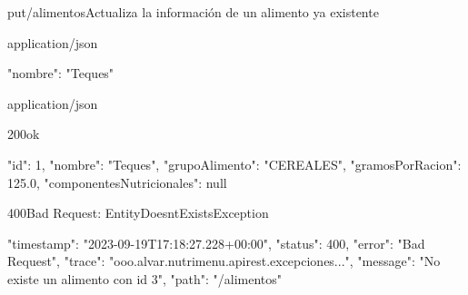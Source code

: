 \begin{apiRoute}{put}{/alimentos}{Actualiza la información de un alimento ya existente}
	\begin{routeParameter}
	\end{routeParameter}
	
	\begin{routeRequest}{application/json}
		\begin{routeRequestBody}
{
	"nombre": "Teques"
}
		\end{routeRequestBody}
	\end{routeRequest}
	\begin{routeResponse}{application/json}
		\begin{routeResponseItem}{200}{ok}
			\begin{routeResponseItemBody}
{
    "id": 1,
    "nombre": "Teques",
    "grupoAlimento": "CEREALES",
    "gramosPorRacion": 125.0,
    "componentesNutricionales": null
}
			\end{routeResponseItemBody}
		\end{routeResponseItem}
		\begin{routeResponseItem}{400}{Bad Request: EntityDoesntExistsException}
			\begin{routeResponseItemBody}
{
    "timestamp": "2023-09-19T17:18:27.228+00:00",
    "status": 400,
    "error": "Bad Request",
    "trace": "ooo.alvar.nutrimenu.apirest.excepciones...",
    "message": "No existe un alimento con id 3",
    "path": "/alimentos"
}
			\end{routeResponseItemBody}
		\end{routeResponseItem}
	\end{routeResponse}
\end{apiRoute}


